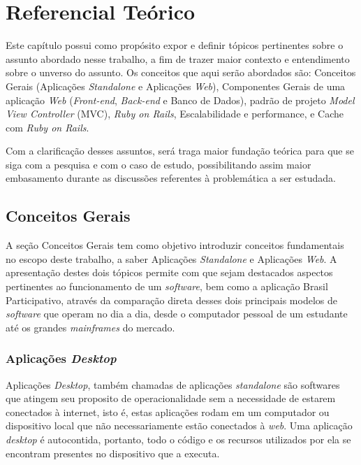\chapter{Referencial Teórico}

Este capítulo possui como propósito expor e definir tópicos pertinentes sobre o assunto abordado nesse trabalho, a fim de trazer maior contexto e entendimento sobre o unverso do assunto. Os conceitos que aqui serão abordados são: Conceitos Gerais (Aplicações \textit{Standalone} e Aplicações \textit{Web}), Componentes Gerais de uma aplicação \textit{Web} (\textit{Front-end}, \textit{Back-end} e Banco de Dados), padrão de projeto \textit{Model View Controller} (MVC), \textit{Ruby on Rails}, Escalabilidade e performance, e Cache com \textit{Ruby on Rails}.

Com a clarificação desses assuntos, será traga maior fundação teórica para que se siga com a pesquisa e com o caso de estudo, possibilitando assim maior embasamento durante as discussões referentes à problemática a ser estudada.

\section{Conceitos Gerais}

A seção Conceitos Gerais tem como objetivo introduzir conceitos fundamentais no escopo deste trabalho, a saber Aplicações \textit{Standalone} e Aplicações \textit{Web}. A apresentação destes dois tópicos permite com que sejam destacados aspectos pertinentes ao funcionamento de um \textit{software}, bem como a aplicação Brasil Participativo, através da comparação direta desses dois principais modelos de \textit{software} que operam no dia a dia, desde o computador pessoal de um estudante até os grandes \textit{mainframes} do mercado.

\subsection{Aplicações \textit{Desktop}}

Aplicações \textit{Desktop}, também chamadas de aplicações \textit{standalone} são softwares que atingem seu proposito de operacionalidade sem a necessidade de estarem conectados à internet, isto é, estas aplicações rodam em um computador ou dispositivo local que não necessariamente estão conectados à \textit{web}. Uma aplicação \textit{desktop} é autocontida, portanto, todo o código e os recursos utilizados por ela se encontram presentes no dispositivo que a executa.

